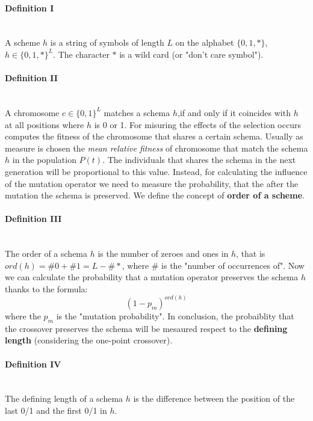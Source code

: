 \documentclass{article}
\begin{document}
\paragraph{Definition I}\mbox{}\\
A scheme $h$ is a string of symbols of length $L$ on the alphabet $\{0,1,*\}$, $h\in\{0,1,*\}^L$. The character
$*$ is a wild card (or "don't care symbol").

\paragraph{Definition II}\mbox{}\\
A chromosome $c\in\{0,1\}^L$ matches a schema $h$,if and only if it coincides
with $h$ at all positions where $h$ is 0 or 1.
\newline\newline
For misuring the effects of the selection occurs computes the fitness of the chromosome that
shares a certain schema. Usually as measure is chosen the \textit{mean relative fitness}
of chromosome that match the schema $h$ in the population $P(t)$. The individuals that shares
the schema in the next generation will be proportional to this value.
\newline\newline
Instead, for calculating the influence of the mutation operator we need to measure the probability,
that the after the mutation the schema is preserved. We define the concept of \textbf{order of
    a scheme}.
\paragraph{Definition III}\mbox{}\\
The order of a schema $h$ is the number of zeroes and ones in $h$, that is $ord(h)=\#0+\#1=L-\#*$,
where $\#$ is the "number of occurrences of".
\newline\newline
Now we can calculate the probability that a mutation operator preserves the schema $h$ thanks
to the formula:
$$(1-p_m)^{ord(h)}$$
where the $p_m$ is the "mutation probability". In conclusion, the probaiblity that the crossover
preserves the schema will be mesaured respect to the \textbf{defining length} (considering
the one-point crossover).

\paragraph{Definition IV}\mbox{}\\
The defining length of a schema $h$ is the difference between the position of the last 0/1
and the first 0/1 in $h$.
\end{document}
